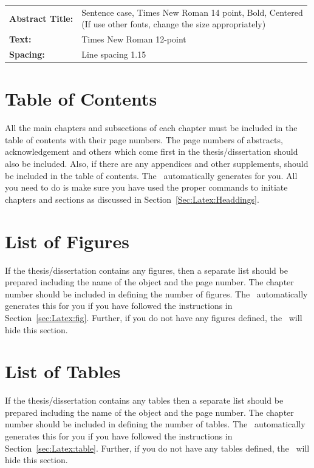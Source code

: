 \documentclass[12pt]{uomthesis}
\begin{document}
\begin{table}[!htb]
    \centering
\begin{tabular}{ll}
\textbf{Abstract Title:} & \makecell[l]{Sentence case, Times New Roman 14 point, Bold, Centered\\(If use other fonts, change the size appropriately)} \\
\textbf{Text:} & Times New Roman 12-point\\
\textbf{Spacing:} & Line spacing 1.15\\
\end{tabular}
\end{table}



\section{Table of Contents}
All the main chapters and subsections of each chapter must be included in the table of contents with their page numbers. The page numbers of abstracts, acknowledgement and others which come first in the thesis/dissertation should also be included. Also, if there are any appendices and other supplements, should be included in the table of contents. The~\TheClass{} automatically generates for you. All you need to do is make sure you have used the proper commands to initiate chapters and sections as discussed in Section~\ref{Sec:Latex:Headdings}.

\section{List of Figures}
If the thesis/dissertation contains any figures, then a separate list should be prepared including the name of the object and the page number. The chapter number should be included in defining the number of figures. The~\TheClass{} automatically generates this for you if you have followed the instructions in Section~\ref{sec:Latex:fig}. Further, if you do not have any figures defined, the~\TheClass{} will hide this section.

\section{List of Tables}
If the thesis/dissertation contains any tables then a separate list should be prepared including the name of the object and the page number. The chapter number should be included in defining the number of tables. The~\TheClass{} automatically generates this for you if you have followed the instructions in Section~\ref{sec:Latex:table}. Further, if you do not have any tables defined, the~\TheClass{} will hide this section.
\end{document}
